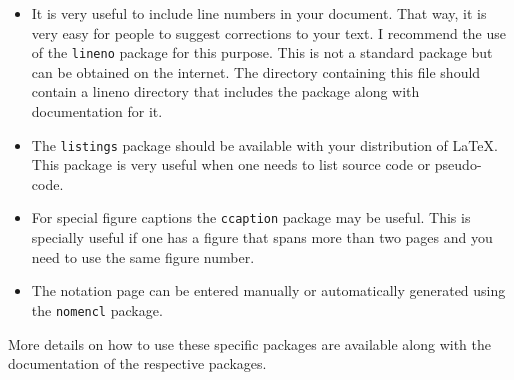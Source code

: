  \begin{itemize}  
 \item It is very useful to include line numbers in your document.
   That way, it is very easy for people to suggest corrections to your
   text.  I recommend the use of the \texttt{lineno} package for this
   purpose.  This is not a standard package but can be obtained on the
   internet.  The directory containing this file should contain a
   lineno directory that includes the package along with documentation
   for it.
 
 \item The \texttt{listings} package should be available with your
   distribution of \LaTeX.  This package is very useful when one needs
   to list source code or pseudo-code.
 
 \item For special figure captions the \texttt{ccaption} package may be
   useful.  This is specially useful if one has a figure that spans
   more than two pages and you need to use the same figure number.
 
 \item The notation page can be entered manually or automatically
   generated using the \texttt{nomencl} package.
 
 \end{itemize}
 
 More details on how to use these specific packages are available along
 with the documentation of the respective packages.
